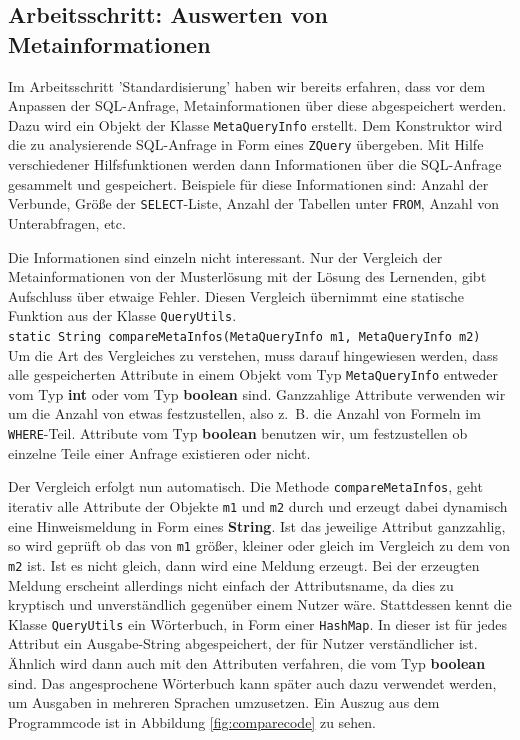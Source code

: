 \subsection*{Arbeitsschritt: Auswerten von Metainformationen} 

Im Arbeitsschritt 'Standardisierung' haben wir bereits erfahren, dass vor dem Anpassen der SQL-Anfrage, Metainformationen über diese abgespeichert werden. Dazu wird ein Objekt der Klasse \verb|MetaQueryInfo| erstellt. Dem Konstruktor wird die zu analysierende SQL-Anfrage in Form eines \verb|ZQuery| übergeben. Mit Hilfe verschiedener Hilfsfunktionen werden dann Informationen über die SQL-Anfrage gesammelt und gespeichert. Beispiele für diese Informationen sind: Anzahl der Verbunde, Größe der \verb|SELECT|-Liste, Anzahl der Tabellen unter \verb|FROM|, Anzahl von Unterabfragen, etc.

Die Informationen sind einzeln nicht interessant. Nur der Vergleich der Metainformationen von der Musterlösung mit der Lösung des Lernenden, gibt Aufschluss über etwaige Fehler. Diesen Vergleich übernimmt eine statische Funktion aus der Klasse \verb|QueryUtils|.\\
\verb|static String compareMetaInfos(MetaQueryInfo m1, MetaQueryInfo m2)|\\
Um die Art des Vergleiches zu verstehen, muss darauf hingewiesen werden, dass alle gespeicherten Attribute in einem Objekt vom Typ \verb|MetaQueryInfo| entweder vom Typ \textbf{int} oder vom Typ \textbf{boolean} sind. Ganzzahlige Attribute verwenden wir um die Anzahl von etwas festzustellen, also \mbox{z. B.} die Anzahl von Formeln im \verb|WHERE|-Teil. Attribute vom Typ \textbf{boolean} benutzen wir, um festzustellen ob einzelne Teile einer Anfrage existieren oder nicht.

Der Vergleich erfolgt nun automatisch. Die Methode \verb|compareMetaInfos|, geht iterativ alle Attribute der Objekte \verb|m1| und \verb|m2| durch und erzeugt dabei dynamisch eine Hinweismeldung in Form eines \textbf{String}. Ist das jeweilige Attribut ganzzahlig, so wird geprüft ob das von \verb|m1| größer, kleiner oder gleich im Vergleich zu dem von \verb|m2| ist. Ist es nicht gleich, dann wird eine Meldung erzeugt. Bei der erzeugten Meldung erscheint allerdings nicht einfach der Attributsname, da dies zu kryptisch und unverständlich gegenüber einem Nutzer wäre. Stattdessen kennt die Klasse \verb|QueryUtils| ein Wörterbuch, in Form einer \verb|HashMap|. In dieser ist für jedes Attribut ein Ausgabe-String abgespeichert, der für Nutzer verständlicher ist. Ähnlich wird dann auch mit den Attributen verfahren, die vom Typ \textbf{boolean} sind. Das angesprochene Wörterbuch kann später auch dazu verwendet werden, um Ausgaben in mehreren Sprachen umzusetzen.
Ein Auszug aus dem Programmcode ist in Abbildung \ref{fig:comparecode} zu sehen.


